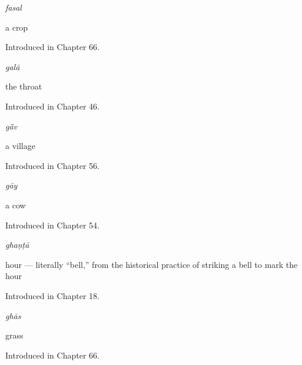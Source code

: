 \noindent\begin{minipage}[t]{\linewidth}
\raggedright
\textbf{}\enspace\emph{fasal}\par
\small a crop\par
\footnotesize Introduced in Chapter 66.
\end{minipage}\par\medskip

\noindent\begin{minipage}[t]{\linewidth}
\raggedright
\textbf{}\enspace\emph{galā}\par
\small the throat\par
\footnotesize Introduced in Chapter 46.
\end{minipage}\par\medskip

\noindent\begin{minipage}[t]{\linewidth}
\raggedright
\textbf{}\enspace\emph{gā̃v}\par
\small a village\par
\footnotesize Introduced in Chapter 56.
\end{minipage}\par\medskip

\noindent\begin{minipage}[t]{\linewidth}
\raggedright
\textbf{}\enspace\emph{gāy}\par
\small a cow\par
\footnotesize Introduced in Chapter 54.
\end{minipage}\par\medskip

\noindent\begin{minipage}[t]{\linewidth}
\raggedright
\textbf{}\enspace\emph{ghaṇṭā}\par
\small hour — literally \textquotedblleft{}bell,\textquotedblright{} from the historical practice of striking a bell to mark the hour\par
\footnotesize Introduced in Chapter 18.
\end{minipage}\par\medskip

\noindent\begin{minipage}[t]{\linewidth}
\raggedright
\textbf{}\enspace\emph{ghās}\par
\small grass\par
\footnotesize Introduced in Chapter 66.
\end{minipage}\par\medskip

